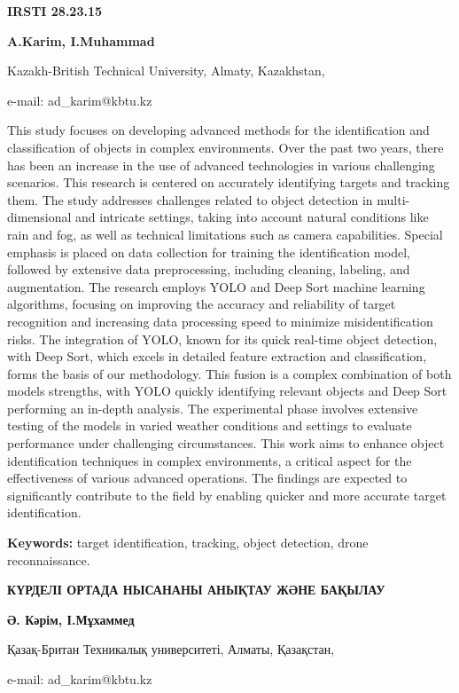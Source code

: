 {\bfseries IRSTI 28.23.15}


\begin{center}
{\bfseries A.Karim, I.Muhammad}

Kazakh-British Technical University, Almaty, Kazakhstan,

e-mail: ad\_karim@kbtu.kz
\end{center}

This study focuses on developing advanced methods for the identification
and classification of objects in complex environments. Over the past two
years, there has been an increase in the use of advanced technologies in
various challenging scenarios. This research is centered on accurately
identifying targets and tracking them. The study addresses challenges
related to object detection in multi-dimensional and intricate settings,
taking into account natural conditions like rain and fog, as well as
technical limitations such as camera capabilities. Special emphasis is
placed on data collection for training the identification model,
followed by extensive data preprocessing, including cleaning, labeling,
and augmentation. The research employs YOLO and Deep Sort machine
learning algorithms, focusing on improving the accuracy and reliability
of target recognition and increasing data processing speed to minimize
misidentification risks. The integration of YOLO, known for its quick
real-time object detection, with Deep Sort, which excels in detailed
feature extraction and classification, forms the basis of our
methodology. This fusion is a complex combination of both
models\textquotesingle{} strengths, with YOLO quickly identifying
relevant objects and Deep Sort performing an in-depth analysis. The
experimental phase involves extensive testing of the models in varied
weather conditions and settings to evaluate performance under
challenging circumstances. This work aims to enhance object
identification techniques in complex environments, a critical aspect for
the effectiveness of various advanced operations. The findings are
expected to significantly contribute to the field by enabling quicker
and more accurate target identification.

{\bfseries Keywords:} target identification, tracking, object detection,
drone reconnaissance.

\begin{center}
{\large\bfseries КҮРДЕЛІ ОРТАДА НЫСАНАНЫ АНЫҚТАУ ЖӘНЕ БАҚЫЛАУ}

{\bfseries Ә. Кәрім, І.Мұхаммед}

Қазақ-Британ Техникалық университеті, Алматы, Қазақстан,

e-mail: ad\_karim@kbtu.kz
\end{center}

